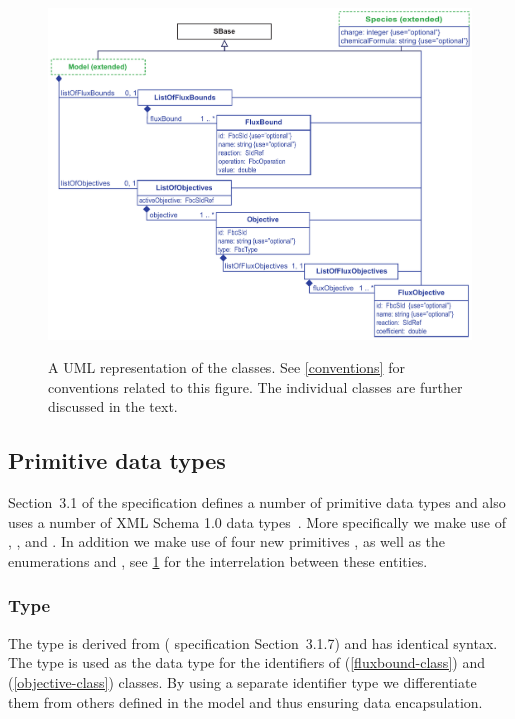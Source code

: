 \begin{figure}[h]
  \centering
  \includegraphics[width=\textwidth]{images/fbc_uml.pdf}\\
  \caption{A UML representation of the \FBCPackage classes. See
  \ref{conventions} for conventions related to this figure. The individual
  classes are further discussed in the text.}
  \label{fig:fbc_uml}
\end{figure}

\subsection{Primitive data types}
\label{primtypes}

Section~3.1 of the \sbmlthreecore specification defines a number of
primitive data types and also uses a number of XML Schema 1.0 data
types~\citep{biron:2000}.  More specifically we make use of
, ,  and . 
In addition we make use of four new primitives
,  as well as the enumerations  
and , see \ref{fig:fbc_uml} for the
interrelation between these entities.

\subsubsection{Type }
\label{primtype-fbcsid}

The type  is derived from  (\sbmlthreecore
specification Section~3.1.7) and has identical syntax. The 
type is used as the data type for the identifiers of \FluxBound
(\ref{fluxbound-class}) and \Objective (\ref{objective-class}) classes. By
using a separate identifier type we differentiate them from others defined
in the \SBML model and thus ensuring data encapsulation.

